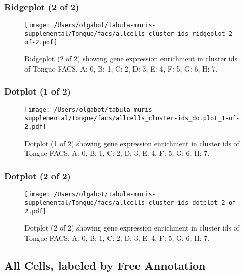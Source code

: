 \clearpage
\clearpage
\subsubsection{Ridgeplot (2 of 2)}
\begin{figure}[h]
\centering
\texttt{[image: /Users/olgabot/tabula-muris-supplemental/Tongue/facs/allcells\_cluster-ids\_ridgeplot\_2-of-2.pdf]}

\caption{ Ridgeplot (2 of 2)  showing gene expression enrichment in cluster ids of Tongue FACS. A: 0, B: 1, C: 2, D: 3, E: 4, F: 5, G: 6, H: 7.}
\end{figure}


\clearpage
\clearpage
\subsubsection{Dotplot (1 of 2)}
\begin{figure}[h]
\centering
\texttt{[image: /Users/olgabot/tabula-muris-supplemental/Tongue/facs/allcells\_cluster-ids\_dotplot\_1-of-2.pdf]}

\caption{ Dotplot (1 of 2)  showing gene expression enrichment in cluster ids of Tongue FACS. A: 0, B: 1, C: 2, D: 3, E: 4, F: 5, G: 6, H: 7.}
\end{figure}


\clearpage
\clearpage
\subsubsection{Dotplot (2 of 2)}
\begin{figure}[h]
\centering
\texttt{[image: /Users/olgabot/tabula-muris-supplemental/Tongue/facs/allcells\_cluster-ids\_dotplot\_2-of-2.pdf]}

\caption{ Dotplot (2 of 2)  showing gene expression enrichment in cluster ids of Tongue FACS. A: 0, B: 1, C: 2, D: 3, E: 4, F: 5, G: 6, H: 7.}
\end{figure}


\clearpage
\subsection{All Cells, labeled by Free Annotation}
